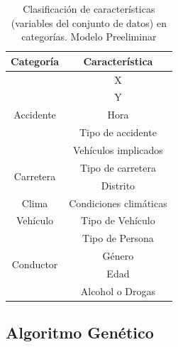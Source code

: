 


\begin{table}[H]
	\centering
	
	\begin{tabular}{ |c|c| }
		\hline
		\textbf{Categoría} & \textbf{Característica} \\
		\hline
		\hline
		\multirow{5}{*}{Accidente} & X \\
		& Y \\
		& Hora \\
		& Tipo de accidente \\
		& Vehículos implicados \\
		\hline
		\hline
		\multirow{2}{*}{Carretera} & Tipo de carretera \\
		& Distrito \\
		\hline
		\hline
		Clima & Condiciones climáticas \\
		\hline
		\hline
		Vehículo & Tipo de Vehículo \\
		\hline
		\hline
		\multirow{4}{*}{Conductor}  & Tipo de Persona \\
		& Género \\
		& Edad \\
		& Alcohol o Drogas \\
		\hline
		\hline
	\end{tabular}
	
	\caption{Clasificación de características (variables del conjunto de datos) en categorías. Modelo Preeliminar}
	\label{JC}
\end{table}



\subsection*{Algoritmo Genético}


